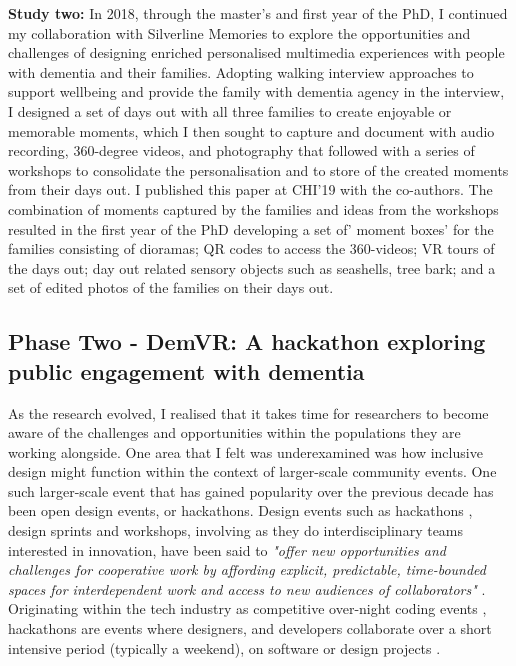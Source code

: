 \textbf{Study two:} In 2018, through the master's and first year of the PhD, I continued my collaboration with Silverline Memories to explore the opportunities and challenges of designing enriched personalised multimedia experiences with people with dementia and their families. Adopting walking interview approaches to support wellbeing and provide the family with dementia agency in the interview, I designed a set of days out with all three families to create enjoyable or memorable moments, which I then sought to capture and document with audio recording, 360-degree videos, and photography that followed with a series of workshops to consolidate the personalisation and to store of the created moments from their days out. I published this paper at CHI'19 with the co-authors. The combination of moments captured by the families and ideas from the workshops resulted in the first year of the PhD developing a set of' moment boxes' for the families consisting of dioramas; QR codes to access the 360-videos; VR tours of the days out; day out related sensory objects such as seashells, tree bark; and a set of edited photos of the families on their days out.

\subsection{Phase Two - DemVR: A hackathon exploring public engagement with dementia}

As the research evolved, I realised that it takes time for researchers to become aware of the challenges and opportunities within the populations they are working alongside. One area that I felt was underexamined was how inclusive design might function within the context of larger-scale community events. One such larger-scale event that has gained popularity over the previous decade has been open design events, or hackathons. Design events such as hackathons \citep{olesen_what_2021}, design sprints and workshops, involving as they do interdisciplinary teams interested in innovation, have been said to \textit{"offer new opportunities and challenges for cooperative work by affording explicit, predictable, time-bounded spaces for interdependent work and access to new audiences of collaborators"} \citep{filippova_hacking_2017}. Originating within the tech industry as competitive over-night coding events \citep{jones_theres_2015}, hackathons are events where designers, and developers collaborate over a short intensive period (typically a weekend), on software or design projects \citep{nandi_hackathons_2016}. 

